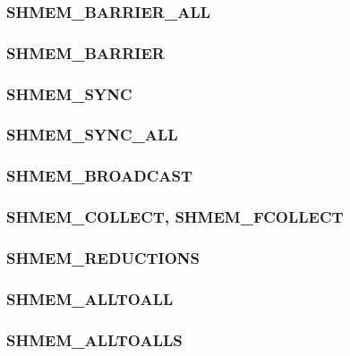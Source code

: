 \documentclass[10pt]{book}
\begin{document}
\subsubsection{\textbf{SHMEM\_BARRIER\_ALL}}\label{subsec:shmem_barrier_all}


\subsubsection{\textbf{SHMEM\_BARRIER}}\label{subsec:shmem_barrier}


\subsubsection{\textbf{SHMEM\_SYNC}}\label{subsec:shmem_sync}


\subsubsection{\textbf{SHMEM\_SYNC\_ALL}}\label{subsec:shmem_sync_all}


\subsubsection{\textbf{SHMEM\_BROADCAST}}\label{subsec:shmem_broadcast}


\subsubsection{\textbf{SHMEM\_COLLECT, SHMEM\_FCOLLECT}}\label{subsec:shmem_collect}


\subsubsection{\textbf{SHMEM\_REDUCTIONS}}\label{subsec:shmem_reductions}


\subsubsection{\textbf{SHMEM\_ALLTOALL}}\label{subsec:shmem_alltoall}


\subsubsection{\textbf{SHMEM\_ALLTOALLS}}\label{subsec:shmem_alltoalls}

\end{document}
